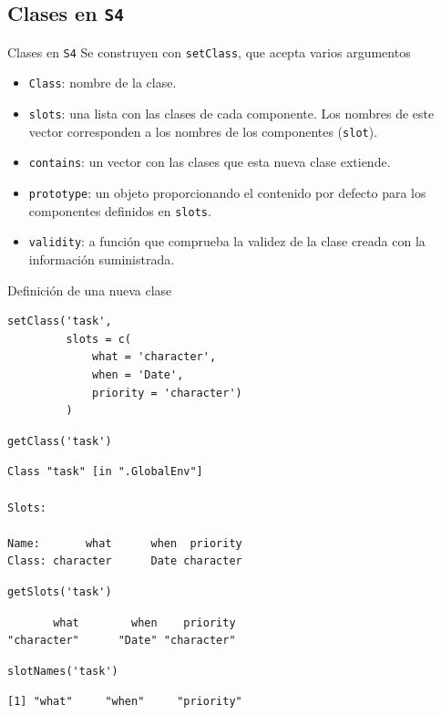 \documentclass[xcolor={usenames,svgnames,dvipsnames}]{beamer}
\begin{document}
\subsection{Clases en \texttt{S4}}
\label{sec:orgheadline31}
\begin{frame}[fragile,label={sec:orgheadline21}]{Clases en \texttt{S4}}
 Se construyen con \texttt{setClass}, que acepta varios argumentos
\begin{itemize}
\item \texttt{Class}: nombre de la clase.
\item \texttt{slots}: una lista con las clases de cada componente. Los nombres de este vector corresponden a los nombres de los componentes (\texttt{slot}).
\item \texttt{contains}: un vector con las clases que esta nueva clase extiende.
\item \texttt{prototype}: un objeto proporcionando el contenido por defecto para los componentes definidos en \texttt{slots}.
\item \texttt{validity}: a función que comprueba la validez de la clase creada con la información suministrada.
\end{itemize}
\end{frame}
\begin{frame}[fragile,label={sec:orgheadline22}]{Definición de una nueva clase}
 \lstset{language=R,label= ,caption= ,captionpos=b,numbers=none}
\begin{lstlisting}
setClass('task',
         slots = c(
             what = 'character',
             when = 'Date',
             priority = 'character')
         )
\end{lstlisting}

\lstset{language=R,label= ,caption= ,captionpos=b,numbers=none}
\begin{lstlisting}
getClass('task')
\end{lstlisting}

\begin{verbatim}
Class "task" [in ".GlobalEnv"]

Slots:
                                    
Name:       what      when  priority
Class: character      Date character
\end{verbatim}

\lstset{language=R,label= ,caption= ,captionpos=b,numbers=none}
\begin{lstlisting}
getSlots('task')
\end{lstlisting}

\begin{verbatim}
       what        when    priority 
"character"      "Date" "character"
\end{verbatim}

\lstset{language=R,label= ,caption= ,captionpos=b,numbers=none}
\begin{lstlisting}
slotNames('task')
\end{lstlisting}

\begin{verbatim}
[1] "what"     "when"     "priority"
\end{verbatim}
\end{frame}
\end{document}
